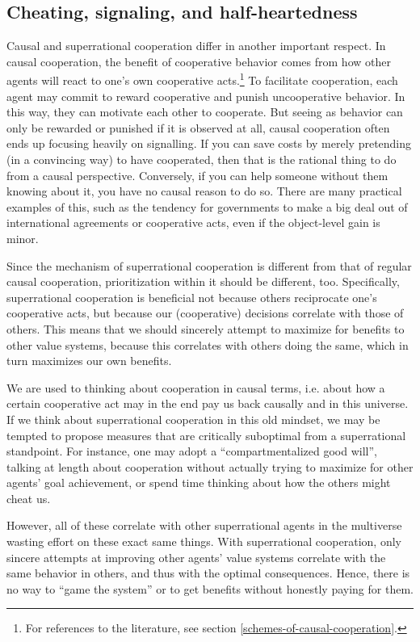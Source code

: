 \hypertarget{cheating-signaling-and-half-heartedness}{\subsection{Cheating,
signaling, and
half-heartedness}\label{cheating-signaling-and-half-heartedness}}

Causal and superrational cooperation differ in another important
respect. In causal cooperation, the benefit of cooperative behavior
comes from how other agents will react to one's own cooperative
acts.\footnote{For references to the literature, see section
  \ref{schemes-of-causal-cooperation}.} To facilitate cooperation, each agent may
commit to reward cooperative and punish uncooperative behavior. In this
way, they can motivate each other to cooperate. But seeing as behavior
can only be rewarded or punished if it is observed at all, causal
cooperation often ends up focusing heavily on signalling. If you can
save costs by merely pretending (in a convincing way) to have
cooperated, then that is the rational thing to do from a causal
perspective. Conversely, if you can help someone without them knowing
about it, you have no causal reason to do so. There are many practical
examples of this, such as the tendency for governments to make a big
deal out of international agreements or cooperative acts, even if the
object-level gain is minor.

Since the mechanism of superrational cooperation is different from that
of regular causal cooperation, prioritization within it should be
different, too. Specifically, superrational cooperation is beneficial
not because others reciprocate one's cooperative acts, but because our
(cooperative) decisions correlate with those of others. This means that
we should sincerely attempt to maximize for benefits to other value
systems, because this correlates with others doing the same, which in
turn maximizes our own benefits.

We are used to thinking about cooperation in causal terms, i.e. about
how a certain cooperative act may in the end pay us back causally and in
this universe. If we think about superrational cooperation in this old
mindset, we may be tempted to propose measures that are critically
suboptimal from a superrational standpoint. For instance, one may adopt
a ``compartmentalized good will'', talking at length about cooperation
without actually trying to maximize for other agents' goal achievement,
or spend time thinking about how the others might cheat us.

However, all of these correlate with other superrational agents in the
multiverse wasting effort on these exact same things. With superrational
cooperation, only sincere attempts at improving other agents' value
systems correlate with the same behavior in others, and thus with the
optimal consequences. Hence, there is no way to ``game the system'' or
to get benefits without honestly paying for them.
